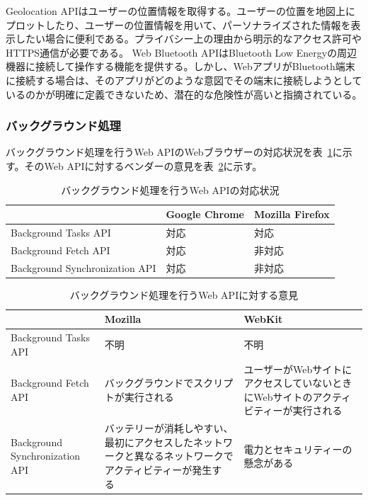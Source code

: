 Geolocation APIはユーザーの位置情報を取得する。ユーザーの位置を地図上にプロットしたり、ユーザーの位置情報を用いて、パーソナライズされた情報を表示したい場合に便利である。プライバシー上の理由から明示的なアクセス許可やHTTPS通信が必要である。
Web Bluetooth APIはBluetooth Low Energyの周辺機器に接続して操作する機能を提供する。しかし、WebアプリがBluetooth端末に接続する場合は、そのアプリがどのような意図でその端末に接続しようとしているのかが明確に定義できないため、潜在的な危険性が高いと指摘されている。
\subsubsection{バックグラウンド処理}
\label{subsubsection:バックグラウンド処理}
バックグラウンド処理を行うWeb APIのWebブラウザーの対応状況を表~\ref{table:バックグラウンド処理を行うWeb APIの対応状況}に示す。そのWeb APIに対するベンダーの意見を表~\ref{table:バックグラウンド処理を行うWeb APIに対する意見}に示す。
\begin{table}
  \caption{バックグラウンド処理を行うWeb APIの対応状況}\label{table:バックグラウンド処理を行うWeb APIの対応状況}
  \centering
  \begin{tabular}{|p{13em}|p{8em}|p{8em}|}
    \hline
    & Google Chrome & Mozilla Firefox \\ \hline
    Background Tasks API & \cellcolor{green!25}対応 & \cellcolor{green!25}対応 \\ \hline
    Background Fetch API & \cellcolor{green!25}対応 & \cellcolor{red!25}非対応 \\ \hline
    Background Synchronization API & \cellcolor{green!25}対応 & \cellcolor{red!25}非対応 \\ \hline
  \end{tabular}
\end{table}
\begin{table}
  \caption{バックグラウンド処理を行うWeb APIに対する意見}
  \label{table:バックグラウンド処理を行うWeb APIに対する意見}
    \centering
    \begin{tabular}{|p{13em}|p{13em}|p{13em}|}
        \hline
        & Mozilla & WebKit \\ \hline
        Background Tasks API & 不明 & 不明 \\ \hline
        Background Fetch API & \cellcolor{red!25}バックグラウンドでスクリプトが実行される~\cite{MozillaBackgroundFetchAPI} & \cellcolor{red!25}ユーザーがWebサイトにアクセスしていないときにWebサイトのアクティビティーが実行される~\cite{WebKitBackgroundFetchAPI} \\ \hline
        Background Synchronization API & \cellcolor{red!25}バッテリーが消耗しやすい、最初にアクセスしたネットワークと異なるネットワークでアクティビティーが発生する~\cite{MozillaBackgroundSynchronizationAPI} & \cellcolor{red!25}電力とセキュリティーの懸念がある \\ \hline
    \end{tabular}
\end{table}

